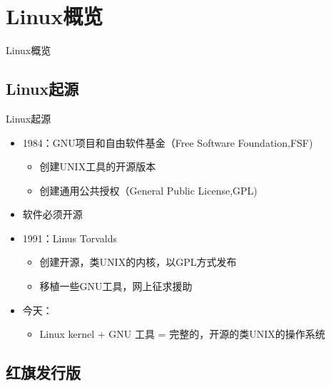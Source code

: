 \section{Linux概览}



\begin{frame}[shrink]{Linux概览}
	\tableofcontents[currentsection]
\end{frame}


\subsection{Linux起源}

\begin{frame}{Linux起源}
\begin{itemize}
\item 1984：GNU项目和自由软件基金（Free Software Foundation,FSF)

\begin{itemize}
\item 创建UNIX工具的开源版本
\item 创建通用公共授权（General Public License,GPL)
\end{itemize}

\item 软件必须开源

\item 1991：Linus Torvalds

\begin{itemize}
\item 创建开源，类UNIX的内核，以GPL方式发布
\item 移植一些GNU工具，网上征求援助
\end{itemize}
\item 今天：

\begin{itemize}
\item Linux kernel + GNU 工具 = 完整的，开源的类UNIX的操作系统
\end{itemize}


\end{itemize}

\end{frame}

\subsection{红旗发行版}


